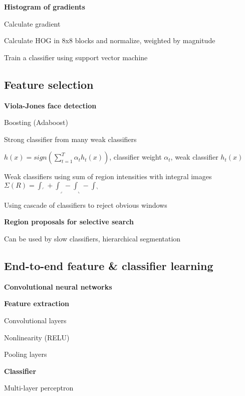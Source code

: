 \documentclass{article}
\begin{document}
\begin{multicols*}{2}
{	\textbf{Histogram of gradients}

	\begin{compactenum}
		\item Calculate gradient
		\item Calculate HOG in 8x8 blocks and normalize, weighted by magnitude
		\item Train a classifier using support vector machine
	\end{compactenum}

	\subsection{Feature selection}

	\textbf{Viola-Jones face detection}

	Boosting (Adaboost)
	\begin{compactitem}
		\item Strong classifier from many weak classifiers

		$h(x) = sign(\sum_{t=1}^{T} \alpha_t h_t(x) )$, classifier weight $\alpha_t$, weak classifier $h_t(x)$

		\item Weak classifiers using sum of region intensities with integral images $\Sigma (R) = \int_\ulcorner + \int_\lrcorner - \int_\llcorner - \int_\urcorner$

		\item Using cascade of classifiers to reject obvious windows
	\end{compactitem}

	\textbf{Region proposals for selective search}

	Can be used by slow classifiers, hierarchical segmentation

	\subsection{End-to-end feature \& classifier learning}

	\textbf{Convolutional neural networks}

	\begin{compactitem}
		\item[] \textbf{Feature extraction}
		\item Convolutional layers
		\item Nonlinearity (RELU)
		\item Pooling layers
		\item[] \textbf{Classifier}
		\item Multi-layer perceptron
	\end{compactitem}

}
\end{multicols*}
\end{document}
